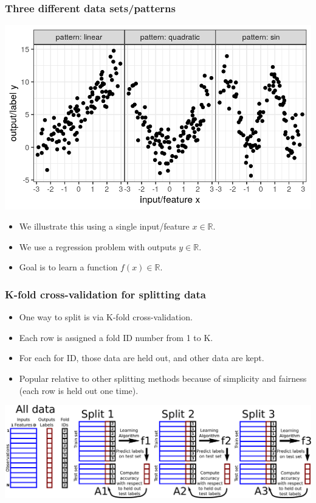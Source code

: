 \documentclass{beamer}
\begin{document}
\begin{frame}
  \frametitle{Three different data sets/patterns}
  \includegraphics[width=\textwidth]{figure-overfitting-data}

  \begin{itemize}
   \item We illustrate this using a single input/feature
    $x\in\mathbb R$.
  \item We use a regression problem with outputs $y\in\mathbb R$.
  \item Goal is to learn a function $f(x)\in\mathbb R$.
  \end{itemize}
\end{frame}

\begin{frame}
  \frametitle{K-fold cross-validation for splitting data}
  \begin{itemize}
  \item One way to split is via K-fold cross-validation. 
\item Each row is assigned a fold ID number from 1 to K.
\item For each for ID, those data are held out, and other data are kept.
\item Popular relative to other splitting methods because of simplicity and fairness (each row is held out one time).
\end{itemize}
\includegraphics[width=\textwidth]{drawing-cross-validation}
\end{frame}
\end{document}

